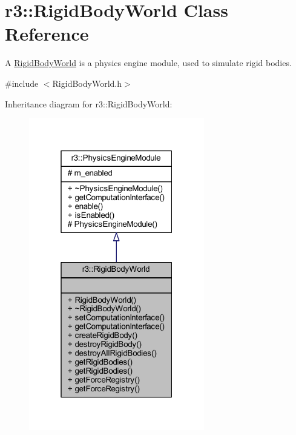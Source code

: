 \hypertarget{classr3_1_1_rigid_body_world}{}\section{r3\+:\+:Rigid\+Body\+World Class Reference}
\label{classr3_1_1_rigid_body_world}


A \mbox{\hyperlink{classr3_1_1_rigid_body_world}{Rigid\+Body\+World}} is a physics engine module, used to simulate rigid bodies.  




{\ttfamily \#include $<$Rigid\+Body\+World.\+h$>$}



Inheritance diagram for r3\+:\+:Rigid\+Body\+World\+:\nopagebreak
\begin{figure}[H]
\begin{center}
\leavevmode
\includegraphics[width=217pt]{classr3_1_1_rigid_body_world__inherit__graph}
\end{center}
\end{figure}


